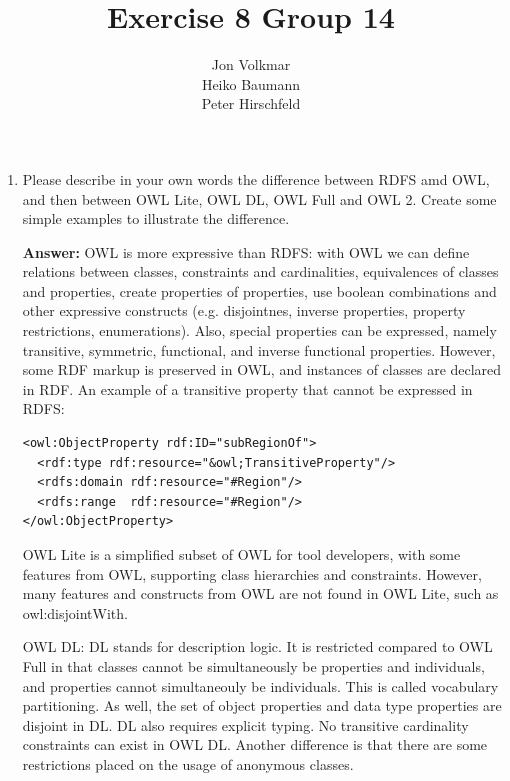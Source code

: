 \documentclass[10pt,a4paper]{article}
\title{\textbf{Exercise 8 Group 14}}
\author{Jon Volkmar\\
		Heiko Baumann\\
		Peter Hirschfeld}
\date{}
\begin{document}
\maketitle


\begin{enumerate}
\item Please describe in your own words the difference between RDFS amd OWL, and 
then between OWL Lite, OWL DL, OWL Full and OWL 2. Create some simple 
examples to illustrate the difference.

\textbf{Answer:}
OWL is more expressive than RDFS: with OWL we can define relations between classes, constraints and cardinalities, equivalences of classes and properties, create properties of properties, use boolean combinations and other expressive constructs (e.g. disjointnes, inverse properties, property restrictions, enumerations). Also, special properties can be expressed, namely transitive, symmetric, functional, and inverse functional properties. However, some RDF markup is preserved in OWL, and instances of classes are declared in RDF. An example of a transitive property that cannot be expressed in RDFS:

\begin{verbatim}
<owl:ObjectProperty rdf:ID="subRegionOf">
  <rdf:type rdf:resource="&owl;TransitiveProperty"/>
  <rdfs:domain rdf:resource="#Region"/>
  <rdfs:range  rdf:resource="#Region"/>
</owl:ObjectProperty>
\end{verbatim}

OWL Lite is a simplified subset of OWL for tool developers, with some features from OWL, supporting class hierarchies and constraints. However, many features and constructs from OWL are not found in OWL Lite, such as owl:disjointWith.

OWL DL: DL stands for description logic. It is restricted compared to OWL Full in that classes cannot be simultaneously be properties and individuals, and properties cannot simultaneouly be individuals. This is called vocabulary partitioning. As well, the set of object properties and data type properties are disjoint in DL. DL also requires explicit typing. No transitive cardinality constraints can exist in OWL DL. Another difference is that there are some restrictions placed on the usage of anonymous classes.


\end{enumerate}
\end{document}
